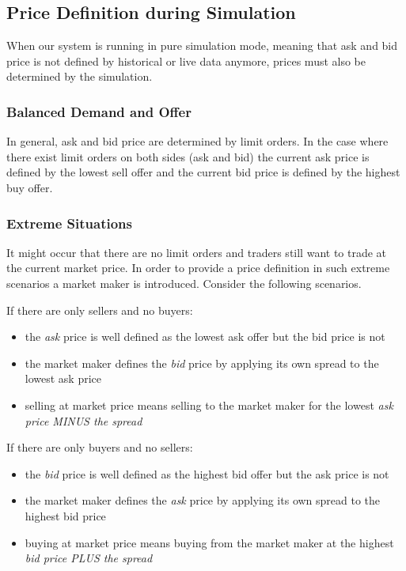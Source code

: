 \subsection{Price Definition during Simulation}

When our system is running in pure simulation mode, meaning that ask and bid price is
not defined by historical or live data anymore, prices must also be determined by the
simulation.

\subsubsection{Balanced Demand and Offer}
In general, ask and bid price are determined by limit orders. In the case where there
exist limit orders on both sides (ask and bid) the current ask price is defined by the
lowest sell offer and the current bid price is defined by the highest buy offer.

\subsubsection{Extreme Situations}
It might occur that there are no limit orders and traders still want to trade at the
current market price. In order to provide a price definition in such extreme scenarios
a market maker is introduced. Consider the following scenarios.

%
If there are only sellers and no buyers:
\begin{itemize}
    \item the \textit{ask} price is well defined as the lowest ask offer but the bid price is not
    \item the market maker defines the \textit{bid} price by applying its own spread to the lowest ask price
    \item selling at market price means selling to the market maker for the lowest \textit{ask price MINUS the spread}
\end{itemize}

If there are only buyers and no sellers:
\begin{itemize}
    \item the \textit{bid} price is well defined as the highest bid offer but the ask price is not
    \item the market maker defines the \textit{ask} price by applying its own spread to the highest bid price
    \item buying at market price means buying from the market maker at the highest \textit{bid price PLUS the spread}
\end{itemize}

